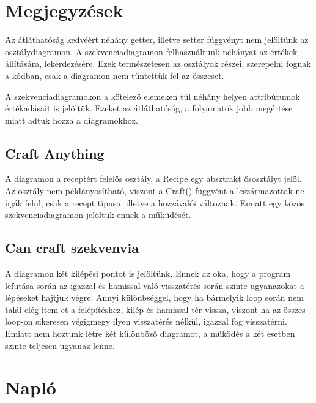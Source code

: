 \documentclass[../../projlab]{subfiles}
\begin{document}
\section{Megjegyzések}

Az átláthatóság kedvéért néhány getter, illetve setter függvényt nem jelöltünk az osztálydiagramon. A szekvenciadiagramon felhasználtunk néhányat az értékek állítására, lekérdezésére. Ezek természetesen az osztályok részei, szerepelni fognak a kódban, csak a diagramon nem tüntettük fel az összeset.

A szekvenciadiagramokon a kötelező elemeken túl néhány helyen attribútumok értékadásait is jelöltük. Ezeket az átláthatóság, a folyamatok jobb megértése miatt adtuk hozzá a diagramokhoz. 

\subsection{Craft Anything}
A diagramon a receptért felelős osztály, a Recipe egy absztrakt ősosztályt jelöl. Az osztály nem példányosítható, viszont a Craft() függvént a leszármazottak ne írják felül, csak a recept típusa, illetve a hozzávalói változnak. Emiatt egy közös szekvenciadiagramon jelöltük ennek a műküdését.

\subsection{Can craft szekvenvia}
A diagramon két kilépési pontot is jelöltünk. Ennek az oka, hogy a program lefutása során az igazzal és hamissal való visszatérés során szinte ugyanazokat a lépéseket hajtjuk végre. Annyi különbséggel, hogy ha bármelyik loop során nem talál elég item-et a felépítéshez, kilép és hamissal tér vissza, viszont ha az összes loop-on sikeresen végigmegy ilyen visszatérés nélkül, igazzal fog visszatérni. Emiatt nem hoztunk létre két különböző diagramot, a működés a két esetben szinte teljesen ugyanaz lenne.

\section{Napló}
\end{document}
